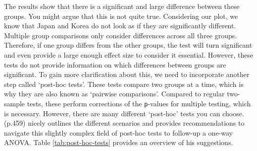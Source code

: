 \documentclass[
]{book}
\newenvironment{Shaded}{\begin{snugshade}}{\end{snugshade}}
\newcommand{\CommentTok}[1]{\textcolor[rgb]{0.56,0.35,0.01}{\textit{#1}}}
\newcommand{\DocumentationTok}[1]{\textcolor[rgb]{0.56,0.35,0.01}{\textbf{\textit{#1}}}}
\newcommand{\FunctionTok}[1]{\textcolor[rgb]{0.00,0.00,0.00}{#1}}
\newcommand{\NormalTok}[1]{#1}
\newcommand{\SpecialCharTok}[1]{\textcolor[rgb]{0.00,0.00,0.00}{#1}}
\begin{document}
\begin{Shaded}
\end{Shaded}

The results show that there is a significant and large difference between these groups. You might argue that this is not quite true. Considering our plot, we know that Japan and Korea do not look as if they are significantly different. Multiple group comparisons only consider differences across all three groups. Therefore, if one group differs from the other groups, the test will turn significant and even provide a large enough effect size to consider it essential. However, these tests do not provide information on which differences between groups are significant. To gain more clarification about this, we need to incorporate another step called `post-hoc tests'. These tests compare two groups at a time, which is why they are also known as `pairwise comparisons'. Compared to regular two-sample tests, these perform corrections of the \texttt{p}-values for multiple testing, which is necessary. However, there are many different `post-hoc' tests you can choose. \citet{field2013discovering} (p.459) nicely outlines the different scenarios and provides recommendations to navigate this slightly complex field of post-hoc tests to follow-up a one-way ANOVA. Table \ref{tab:post-hoc-tests} provides an overview of his suggestions.
\end{document}
